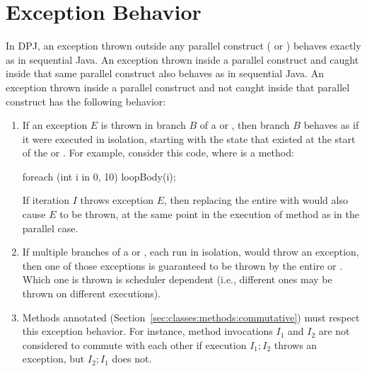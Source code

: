 \section{Exception Behavior%
\label{sec:exceptions}}

In DPJ, an exception thrown outside any parallel construct
( or ) behaves exactly as in sequential
Java.  An exception thrown inside a parallel construct and caught
inside that same parallel construct also behaves as in sequential
Java.  An exception thrown inside a parallel construct and not caught
inside that parallel construct has the following behavior:

\begin{enumerate}
\item If an exception $E$ is thrown in branch $B$ of a 
  or , then branch $B$ behaves as if it were executed in
  isolation, starting with the state that existed at the start of the
   or .  For example, consider this code,
  where  is a method:

\begin{dpjlisting}
foreach (int i in 0, 10) {
  loopBody(i);
}
\end{dpjlisting}

If iteration $I$ throws exception $E$, then replacing the entire
 with  would also cause $E$ to be
thrown, at the same point in the execution of method  as
in the parallel case.

\item If multiple branches of a  or , each
  run in isolation, would throw an exception, then one of those
  exceptions is guaranteed to be thrown by the entire  or
  .  Which one is thrown is scheduler dependent (i.e.,
  different ones may be thrown on different executions).

\item Methods annotated 
  (Section~\ref{sec:classes:methods:commutative}) must respect this
  exception behavior.  For instance, method invocations $I_1$ and
  $I_2$ are not considered to commute with each other if execution
  $I_1; I_2$ throws an exception, but $I_2; I_1$ does not.

\end{enumerate}
